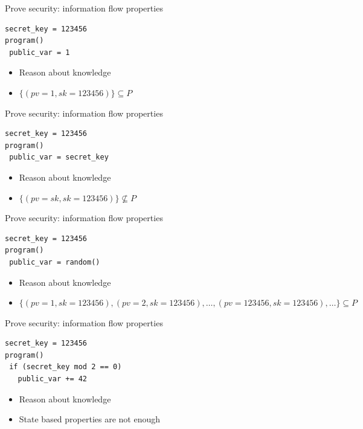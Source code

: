 \documentclass{beamer}
\begin{document}
\begin{frame}[fragile]{Prove security: information flow properties}
  \begin{verbatim}
secret_key = 123456
program()
 public_var = 1
  \end{verbatim}
  \begin{itemize}
  \item Reason about knowledge
  \item<2-> $\{(pv=1, sk=123456)\} \subseteq P$
  \end{itemize}
\end{frame}

\begin{frame}[fragile]{Prove security: information flow properties}
  \begin{verbatim}
secret_key = 123456
program()
 public_var = secret_key
  \end{verbatim}
  \begin{itemize}
  \item Reason about knowledge
  \item<2-> $\{(pv=sk, sk=123456)\} \not \subseteq P$
  \end{itemize}
\end{frame}

\begin{frame}[fragile]{Prove security: information flow properties}
  \begin{verbatim}
secret_key = 123456
program()
 public_var = random()
  \end{verbatim}
  \begin{itemize}
  \item Reason about knowledge
  \item<2-> $\{(pv=1, sk=123456), (pv=2, sk=123456), \dots ,
    (pv=123456, sk=123456), \dots\} \subseteq P$
  \end{itemize}
\end{frame}

\begin{frame}[fragile]{Prove security: information flow properties}
  \begin{verbatim}
secret_key = 123456
program()
 if (secret_key mod 2 == 0)
   public_var += 42
  \end{verbatim}
  \begin{itemize}
  \item Reason about knowledge
  \item<2-> State based properties are not enough
  \end{itemize}
\end{frame}
\end{document}
